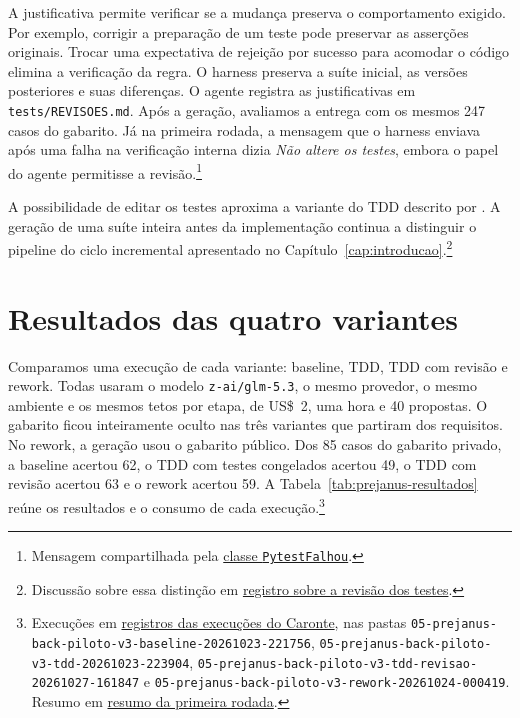 \documentclass[a4paper,12pt,twoside,english,brazilian]{book}
\begin{document}
A justificativa permite verificar se a mudança preserva o comportamento
exigido. Por exemplo, corrigir a preparação de um teste pode preservar
as asserções originais. Trocar uma expectativa de rejeição por sucesso
para acomodar o código elimina a verificação da regra. O harness
preserva a suíte inicial, as versões posteriores e suas diferenças. O
agente registra as justificativas em \texttt{tests/REVISOES.md}. Após a
geração, avaliamos a entrega com os mesmos 247 casos do gabarito. Já na
primeira rodada, a mensagem que o harness enviava após uma falha na
verificação interna dizia \emph{Não altere os testes}, embora o papel do
agente permitisse a revisão.\footnote{Mensagem compartilhada pela
\href{https://github.com/Educg550/tcc/blob/ee6d001c1f618419c6184644d18aa97bb33bcf9a/demos/harness/models/observacoes.py}{classe \texttt{PytestFalhou}}.}

A possibilidade de editar os testes aproxima a variante do TDD descrito
por \citet{beck2003tdd}. A geração de uma suíte inteira antes da
implementação continua a distinguir o pipeline do ciclo incremental
apresentado no Capítulo~\ref{cap:introducao}.\footnote{Discussão sobre essa
distinção em
\href{https://github.com/Educg550/tcc/blob/ee6d001c1f618419c6184644d18aa97bb33bcf9a/blog/2026-10-27-tdd-e-revisao-dos-testes.md}{registro sobre a revisão dos testes}.}

\section{Resultados das quatro variantes}
\label{sec:prejanus-resultados}

Comparamos uma execução de cada variante: baseline, TDD, TDD com
revisão e rework. Todas usaram o modelo \texttt{z-ai/glm-5.3}, o mesmo
provedor, o mesmo ambiente e os mesmos tetos por etapa, de US\$~2, uma hora e
40 propostas. O gabarito ficou inteiramente oculto nas três variantes que partiram
dos requisitos. No rework, a geração usou o gabarito público. Dos 85 casos
do gabarito privado, a baseline acertou 62, o TDD com testes congelados
acertou 49, o TDD com revisão acertou 63 e o rework acertou 59.
A Tabela~\ref{tab:prejanus-resultados} reúne os resultados e o consumo de
cada execução.\footnote{Execuções em
\href{https://github.com/Educg550/tcc/tree/ee6d001c1f618419c6184644d18aa97bb33bcf9a/demos/runs/caronte}{registros das execuções do Caronte}, nas pastas
\texttt{05-prejanus-back-piloto-v3-baseline-20261023-221756},
\texttt{05-prejanus-back-piloto-v3-tdd-20261023-223904},
\texttt{05-prejanus-back-piloto-v3-tdd-revisao-20261027-161847} e
\texttt{05-prejanus-back-piloto-v3-rework-20261024-000419}. Resumo em
\href{https://github.com/Educg550/tcc/blob/ee6d001c1f618419c6184644d18aa97bb33bcf9a/blog/2026-10-28-resumo-prejanus-back.md}{resumo da primeira rodada}.}
\end{document}
